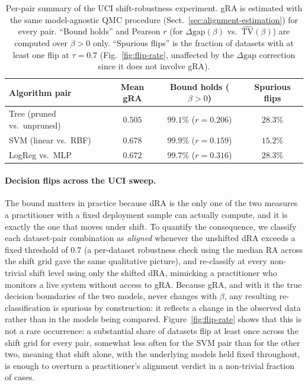 \documentclass[runningheads]{llncs}
\begin{document}
\begin{table}[tbp]
\centering
\caption{Per-pair summary of the UCI shift-robustness experiment. gRA is estimated with the same model-agnostic QMC procedure (Sect.~\ref{sec:alignment-estimation}) for every pair. ``Bound holds'' and Pearson $r$ (for $\Delta\mathrm{gap}(\beta)$ vs.\ $\widehat{\mathrm{TV}}(\beta)$) are computed over $\beta > 0$ only. ``Spurious flips'' is the fraction of datasets with at least one flip at $\tau = 0.7$ (Fig.~\ref{fig:flip-rate}, unaffected by the $\Delta\mathrm{gap}$ correction since it does not involve gRA).}
\label{tab:e3-summary}
\begin{tabular}{lccc}
\toprule
Algorithm pair & Mean gRA & Bound holds ($\beta{>}0$) & Spurious flips \\
\midrule
Tree (pruned vs.\ unpruned) & $0.505$ & $99.1\%$ ($r=0.206$) & $28.3\%$ \\
SVM (linear vs.\ RBF)       & $0.678$ & $99.9\%$ ($r=0.159$) & $15.2\%$ \\
LogReg vs.\ MLP             & $0.672$ & $99.7\%$ ($r=0.316$) & $28.3\%$ \\
\bottomrule
\end{tabular}
\end{table}

\paragraph{Decision flips across the UCI sweep.} The bound matters in practice because dRA is the only one of the two measures a practitioner with a fixed deployment sample can actually compute, and it is exactly the one that moves under shift. To quantify the consequence, we classify each dataset-pair combination as \emph{aligned} whenever the unshifted dRA exceeds a fixed threshold of $0.7$ (a per-dataset robustness check using the median RA across the shift grid gave the same qualitative picture), and re-classify at every non-trivial shift level using only the shifted dRA, mimicking a practitioner who monitors a live system without access to gRA. Because gRA, and with it the true decision boundaries of the two models, never changes with $\beta$, any resulting re-classification is spurious by construction: it reflects a change in the observed data rather than in the models being compared. Figure~\ref{fig:flip-rate} shows that this is not a rare occurrence: a substantial share of datasets flip at least once across the shift grid for every pair, somewhat less often for the SVM pair than for the other two, meaning that shift alone, with the underlying models held fixed throughout, is enough to overturn a practitioner's alignment verdict in a non-trivial fraction of cases.
\end{document}
